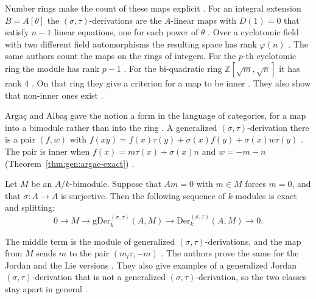 Number rings make the count of these maps explicit
\cite[p.~9]{ManjuSharma2026Twisted}. For an integral extension $B=A[\theta]$ the
$(\sigma,\tau)$-derivations are the $A$-linear maps with $D(1)=0$ that satisfy
$n-1$ linear equations, one for each power of $\theta$
\cite[Theorem~3.2, p.~9]{ManjuSharma2026Twisted}. Over a cyclotomic field with
two different field automorphisms the resulting space has rank $\varphi(n)$
\cite[Corollary~3.5, p.~11]{ManjuSharma2026Twisted}. The same authors count the
maps on the rings of integers. For the $p$-th cyclotomic ring the module has rank
$p-1$ \cite[Corollary~3.9, p.~17]{ManjuSharma2026NumberRings}. For the
bi-quadratic ring $\mathbb{Z}[\sqrt{m},\sqrt{n}]$ it has rank $4$
\cite[Corollary~3.19, p.~24]{ManjuSharma2026NumberRings}. On that ring they give a
criterion for a map to be inner \cite[Theorem~3.22, p.~25]{ManjuSharma2026NumberRings}.
They also show that non-inner ones exist
\cite[Corollary~3.24, p.~26]{ManjuSharma2026NumberRings}.

Arga\c{c} and Alba\c{s} gave the notion a form in the language of categories, for a map into a
bimodule rather than into the ring \cite[p.~977]{ArgacAlbas2002}. A generalized
$(\sigma,\tau)$-derivation there is a pair $(f,w)$ with
$f(xy)=f(x)\tau(y)+\sigma(x)f(y)+\sigma(x)w\tau(y)$
\cite[(2.6), p.~978]{ArgacAlbas2002}. The pair is inner when
$f(x)=m\tau(x)+\sigma(x)n$ and $w=-m-n$ (Theorem~\ref{thm:gen:argac-exact})
\cite[(2.9), p.~978]{ArgacAlbas2002}.\begin{theorem}\label{thm:gen:argac-exact}
Let $M$ be an $A/k$-bimodule. Suppose that $Am=0$ with $m\in M$ forces $m=0$, and
that $\sigma\colon A\to A$ is surjective. Then the following sequence of
$k$-modules is exact and splitting:
\begin{equation*}
0\longrightarrow M\longrightarrow \mathrm{gDer}^{(\sigma,\tau)}_{k}(A,M)
\longrightarrow \mathrm{Der}^{(\sigma,\tau)}_{k}(A,M)\longrightarrow 0 .
\end{equation*}
\end{theorem}

The middle term is the module of generalized $(\sigma,\tau)$-derivations, and the
map from $M$ sends $m$ to the pair $(m_{l}\tau,-m)$
\cite[Theorem~3.1, p.~979]{ArgacAlbas2002}. The authors prove the same for the
Jordan and the Lie versions \cite[Theorems~4.1 and~4.2, pp.~981--982]{ArgacAlbas2002}.
They also give examples of a generalized Jordan $(\sigma,\tau)$-derivation that is
not a generalized $(\sigma,\tau)$-derivation, so the two classes stay apart in
general \cite[Examples~4.1 and~4.3, pp.~982--983]{ArgacAlbas2002}.

